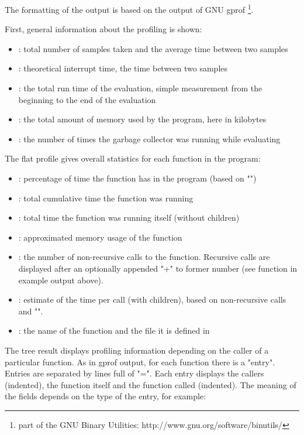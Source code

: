 The formatting of the output is based on the output of
GNU gprof \footnote{part of the GNU Binary Utilities: http://www.gnu.org/software/binutils/}.

First, general information about the profiling is shown:
\begin{itemize}
	\item {}: total number of samples taken and the
		average time between two samples
	\item {}: theoretical interrupt time, the time between
		two samples
	\item {}: the total run time of the evaluation, simple measurement
		from the beginning to the end of the evaluation
	\item {}: the total amount of memory used by the program, here in kilobytes
	\item {}: the number of times the garbage collector was running while evaluating
\end{itemize}

The flat profile gives overall statistics for each function in the program:
\begin{itemize}
\item {}:
	percentage of time the function has in the program (based on "")
\item {}:
	total cumulative time the function was running
\item {}:
	total time the function was running itself (without children)
\item {}:
	approximated memory usage of the function
\item {}:
	the number of non-recursive calls to the function. Recursive calls are displayed after an
	optionally appended "+" to former number (see function  in example output above).
\item {}:
	estimate of the time per call (with children), based on non-recursive calls and "".
\item {}:
	the name of the function and the file it is defined in
\end{itemize}

The tree result displays profiling information depending on the caller of a particular function.
As in gprof output, for each function there is a "entry". Entries are separated by lines full of "=".
Each entry displays the callers (indented), the function itself and the function called (indented).
The meaning of the fields depends on the type of the entry, for example:

